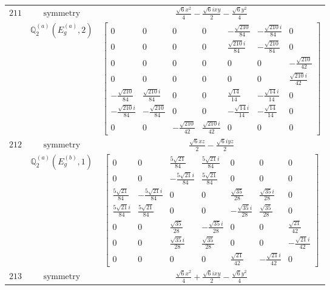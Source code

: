 \documentclass[fleqn,8pt,landscape]{jsarticle}
\begin{document}
\begin{longtable}{ccc}
$ 211 $ & $ \text{symmetry} $ & $ \frac{\sqrt{6} x^{2}}{4} - \frac{\sqrt{6} i x y}{2} - \frac{\sqrt{6} y^{2}}{4} $ \\
$  $ & $ \mathbb{Q}_{2}^{(a)}(E_{g}^{(a)},2) $ & $ \begin{bmatrix} 0 & 0 & 0 & 0 & - \frac{\sqrt{210}}{84} & - \frac{\sqrt{210} i}{84} & 0 \\ 0 & 0 & 0 & 0 & \frac{\sqrt{210} i}{84} & - \frac{\sqrt{210}}{84} & 0 \\ 0 & 0 & 0 & 0 & 0 & 0 & - \frac{\sqrt{210}}{42} \\ 0 & 0 & 0 & 0 & 0 & 0 & \frac{\sqrt{210} i}{42} \\ - \frac{\sqrt{210}}{84} & \frac{\sqrt{210} i}{84} & 0 & 0 & \frac{\sqrt{14}}{14} & - \frac{\sqrt{14} i}{14} & 0 \\ - \frac{\sqrt{210} i}{84} & - \frac{\sqrt{210}}{84} & 0 & 0 & - \frac{\sqrt{14} i}{14} & - \frac{\sqrt{14}}{14} & 0 \\ 0 & 0 & - \frac{\sqrt{210}}{42} & \frac{\sqrt{210} i}{42} & 0 & 0 & 0 \end{bmatrix} $ \\ \hline
$ 212 $ & $ \text{symmetry} $ & $ \frac{\sqrt{6} x z}{2} - \frac{\sqrt{6} i y z}{2} $ \\
$  $ & $ \mathbb{Q}_{2}^{(a)}(E_{g}^{(b)},1) $ & $ \begin{bmatrix} 0 & 0 & \frac{5 \sqrt{21}}{84} & \frac{5 \sqrt{21} i}{84} & 0 & 0 & 0 \\ 0 & 0 & - \frac{5 \sqrt{21} i}{84} & \frac{5 \sqrt{21}}{84} & 0 & 0 & 0 \\ \frac{5 \sqrt{21}}{84} & - \frac{5 \sqrt{21} i}{84} & 0 & 0 & \frac{\sqrt{35}}{28} & \frac{\sqrt{35} i}{28} & 0 \\ \frac{5 \sqrt{21} i}{84} & \frac{5 \sqrt{21}}{84} & 0 & 0 & - \frac{\sqrt{35} i}{28} & \frac{\sqrt{35}}{28} & 0 \\ 0 & 0 & \frac{\sqrt{35}}{28} & - \frac{\sqrt{35} i}{28} & 0 & 0 & \frac{\sqrt{21}}{42} \\ 0 & 0 & \frac{\sqrt{35} i}{28} & \frac{\sqrt{35}}{28} & 0 & 0 & - \frac{\sqrt{21} i}{42} \\ 0 & 0 & 0 & 0 & \frac{\sqrt{21}}{42} & - \frac{\sqrt{21} i}{42} & 0 \end{bmatrix} $ \\ \hline
$ 213 $ & $ \text{symmetry} $ & $ \frac{\sqrt{6} x^{2}}{4} + \frac{\sqrt{6} i x y}{2} - \frac{\sqrt{6} y^{2}}{4} $ \\

\end{longtable}
\end{document}
